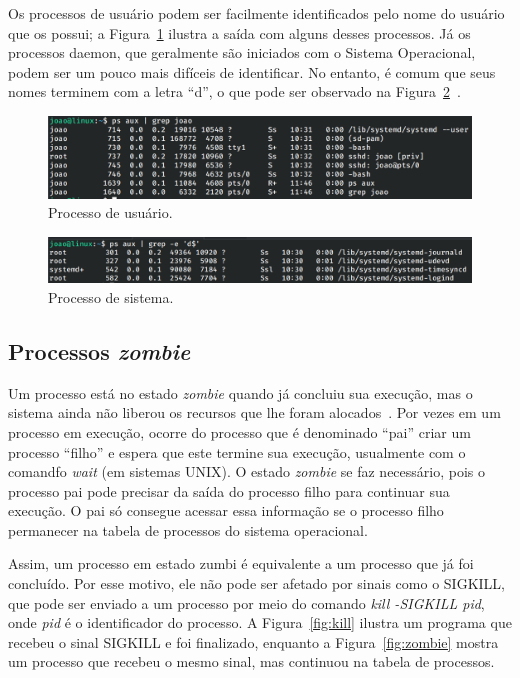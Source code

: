 \documentclass[
	12pt,				%
	oneside,   	        %
	a4paper,			%
	english,			%
	french,				%
	spanish,			%
	brazil,				%
	]{pacotes/abntex2}
\begin{document}
Os processos de usuário podem ser facilmente identificados pelo nome do usuário que os possui; a Figura~\ref{fig:user} ilustra a saída com alguns desses processos. Já os processos daemon, que geralmente são iniciados com o Sistema Operacional, podem ser um pouco mais difíceis de identificar. No entanto, é comum que seus nomes terminem com a letra ``d'', o que pode ser observado na Figura~\ref{fig:daemon}~\cite{negus2012}.

\begin{figure}[H]
  \centering
  \includegraphics[scale=0.45]{figuras/user.png}
  \caption{Processo de usuário.}
  \label{fig:user}
\end{figure}

\begin{figure}[H]
  \centering
  \includegraphics[scale=0.45]{figuras/daemons.png}
  \caption{Processo de sistema.}
  \label{fig:daemon}
\end{figure}

\subsection{Processos \textit{zombie}}
\label{subsec:zombie}

Um processo está no estado \textit{zombie} quando já concluiu sua execução, mas o sistema ainda não liberou os recursos que lhe foram alocados~\cite{stallings2018}. Por vezes em um processo em execução, ocorre do processo que é denominado ``pai'' criar um processo ``filho'' e espera que este termine sua execução, usualmente com o comandfo \textit{wait} (em sistemas UNIX). O estado \textit{zombie} se faz necessário, pois o processo pai pode precisar da saída do processo filho para continuar sua execução. O pai só consegue acessar essa informação se o processo filho permanecer na tabela de processos do sistema operacional.

Assim, um processo em estado zumbi é equivalente a um processo que já foi concluído. Por esse motivo, ele não pode ser afetado por sinais como o SIGKILL, que pode ser enviado a um processo por meio do comando \textit{kill -SIGKILL pid}, onde \textit{pid} é o identificador do processo. A Figura~\ref{fig:kill} ilustra um programa que recebeu o sinal SIGKILL e foi finalizado, enquanto a Figura~\ref{fig:zombie} mostra um processo que recebeu o mesmo sinal, mas continuou na tabela de processos.
\end{document}

